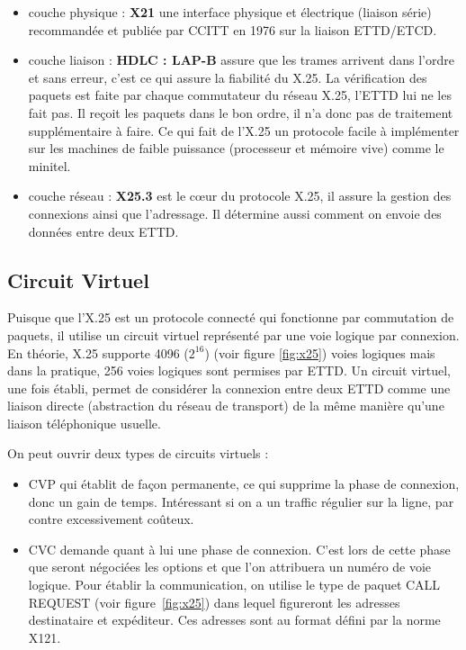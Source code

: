\documentclass[12pt]{report}
\begin{document}
\begin{itemize}
\item couche physique : \textbf{X21} une interface physique et électrique (liaison série) recommandée et publiée par CCITT en 1976 sur la liaison ETTD/ETCD\cite{wikix21}.
\item couche liaison : \textbf{HDLC : LAP-B} assure que les trames arrivent dans l'ordre et sans erreur, c'est ce qui assure la fiabilité du X.25. La vérification des paquets est faite
par chaque commutateur du réseau X.25, l'ETTD lui ne les fait pas. Il reçoit les paquets dans le bon ordre, il n'a donc pas de traitement supplémentaire à faire. Ce qui fait de l'X.25 un protocole facile
à implémenter sur les machines de faible puissance (processeur et mémoire vive) comme le minitel\cite{wikilapb}.
\item couche réseau : \textbf{X25.3} est le cœur du protocole X.25, il assure la gestion des connexions ainsi que l'adressage\cite{gatoux}. Il détermine aussi comment on envoie des données entre deux ETTD.
\end{itemize}

\subsection{Circuit Virtuel}
Puisque que l'X.25 est un protocole connecté qui fonctionne par commutation de paquets, il utilise un circuit virtuel représenté par une voie logique par connexion. En théorie, X.25 supporte 4096 ($2^{16}$) (voir figure \ref{fig:x25}) voies logiques mais dans la pratique, 256 voies logiques sont permises par ETTD.
Un circuit virtuel, une fois établi, permet de considérer la connexion entre deux ETTD comme une liaison directe (abstraction du réseau de transport) de la même manière qu'une liaison téléphonique usuelle\cite{navarro}.

On peut ouvrir deux types de circuits virtuels :
\begin{itemize}
\item \gls{CVP} qui établit de façon permanente, ce qui supprime la phase de connexion, donc un gain de temps. Intéressant si on a un traffic régulier sur la ligne, par contre excessivement coûteux.
\item \gls{CVC} demande quant à lui une phase de connexion. C'est lors de cette phase que seront négociées les options et que l'on attribuera un numéro de voie logique. Pour établir la communication, on utilise le type de paquet \og CALL REQUEST \fg (voir figure~\ref{fig:x25}) dans lequel figureront les adresses destinataire et expéditeur. Ces adresses sont au format défini par la norme X121\cite{navarro}\cite{gateau}.
\end{itemize}
\end{document}
